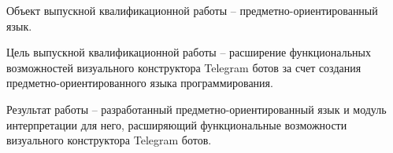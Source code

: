 Объект выпускной квалификационной работы -- предметно-ориентированный язык.

Цель выпускной квалификационной работы -- расширение функциональных возможностей визуального конструктора Telegram ботов
за счет создания предметно-ориентированного языка программирования.

Результат работы -- разработанный предметно-ориентированный язык и модуль интерпретации для него, расширяющий функциональные возможности
визуального конструктора Telegram ботов.